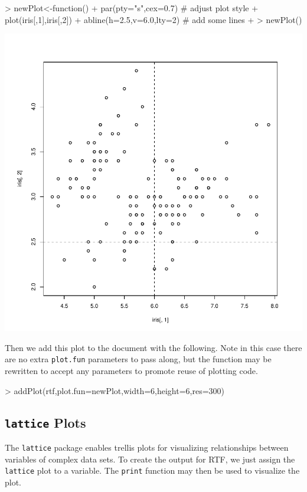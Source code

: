 \documentclass[11pt,letterpaper]{article}
\begin{document}
\begin{Schunk}
\begin{Sinput}
> newPlot<-function() {
+ 	par(pty="s",cex=0.7)      # adjust plot style
+ 	plot(iris[,1],iris[,2])
+ 	abline(h=2.5,v=6.0,lty=2) # add some lines
+ }
> newPlot()
\end{Sinput}
\end{Schunk}
\includegraphics{rtf-021}

Then we add this plot to the document with the following.  Note in this case there are no extra \texttt{plot.fun} parameters to pass along, but the function may be rewritten to accept any parameters to promote reuse of plotting code.

\begin{Schunk}
\begin{Sinput}
> addPlot(rtf,plot.fun=newPlot,width=6,height=6,res=300)
\end{Sinput}
\end{Schunk}


\subsection{\texttt{lattice} Plots}
The \texttt{lattice} package enables trellis plots for visualizing relationships between variables of complex data sets.  To create the output for RTF, we just assign the \texttt{lattice} plot to a variable.  The \texttt{print} function may then be used to visualize the plot.
\end{document}
